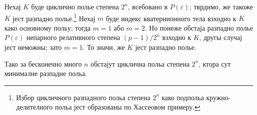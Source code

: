 ﻿\documentclass[11pt]{article}
\begin{document}
Нехај $K$ буде циклично полье степена $2^n$, всебовано в $P(\varepsilon)$; тврдимо, же такоже $K$ јест разпадно полье.\footnote{Избор цикличного разпадного польа степена $2^n$ како подпольа кружно-делителного польа јест образованы по Хассеовом примеру.} Нехај $m$ буде индекс кватернионного тела взходно к $K$ како основному польу; тогда $m=1$ або $m=2$. Но понеже обстаја разпадно полье $P(\varepsilon)$ непарного релативного степена $(p-1)/2^n$ взходно к $K$, другы случај јест неможны; зато $m=1$. То значи, же $K$ јест разпадно полье.

Тако за бесконечно много $n$ обстајут циклична польа степена $2^n$, ктора сут минималне разпадне польа.
\end{document}
